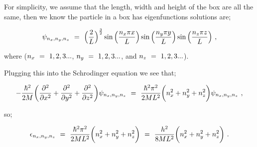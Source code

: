 \documentclass{article}
\begin{document}
For simplicity, we assume that the length, width and height of the box are all the same, then we know the particle in a box has eigenfunctions solutions are;

\begin{equation} \label{eq:256}
\psi_{n_x, n_y, n_z} \hspace{0.125cm} = \hspace{0.125cm} \Big( \frac{2}{L}  \Big)^{\frac{3}{2}} \sin \Big( \frac{n_x \pi x}{L} \Big) \sin \Big( \frac{n_y \pi y}{L} \Big) \sin \Big( \frac{n_z \pi z}{L} \Big) \hspace{0.125cm} ,
\end{equation}

where (\begin{math} n_x \hspace{0.125cm} = \hspace{0.125cm} 1,2,3... \end{math}, \begin{math} n_y \hspace{0.125cm} = \hspace{0.125cm} 1,2,3... \end{math}, and \begin{math} n_z \hspace{0.125cm} = \hspace{0.125cm} 1,2,3... \end{math}). 

Plugging this into the Schrodinger equation we see that;

\begin{equation} \label{eq:256}
- \frac{\hbar^2}{2 M} \bigg( \frac{\partial^2}{\partial{x^2}} + \frac{\partial^2}{\partial{y^2}} + \frac{\partial^2}{\partial{z^2}} \bigg) \psi_{n_x, n_y, n_z} \hspace{0.125cm} = \hspace{0.125cm} \frac{\hbar^2 \pi^2}{2 M L^2} \bigg( n_x^2 + n_y^2 + n_z^2  \bigg) \psi_{n_x, n_y, n_z} \hspace{0.125cm} ,
\end{equation}

so;

\begin{equation} \label{eq:256}
\epsilon_{n_x, n_y, n_z} \hspace{0.125cm} = \hspace{0.125cm} \frac{\hbar^2 \pi^2}{2 M L^2} \bigg( n_x^2 + n_y^2 + n_z^2  \bigg) \hspace{0.125cm} = \hspace{0.125cm} \frac{h^2}{8 M L^2} \bigg( n_x^2 + n_y^2 + n_z^2  \bigg) \hspace{0.125cm} .
\end{equation}
\end{document}
